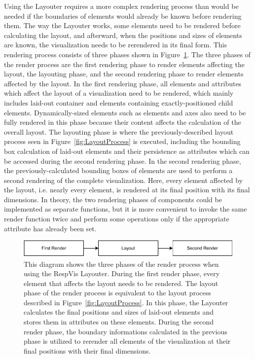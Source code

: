 Using the Layouter requires a more complex rendering process than
would be needed if the boundaries of elements would already be known
before rendering them.  The way the Layouter works, some elements need
to be rendered before calculating the layout, and afterward, when the
positions and sizes of elements are known, the visualization needs to
be rerendered in its final form. This rendering process consists of
three phases shown in Figure~\ref{fig:RenderProcess}. The three phases
of the render process are the first rendering phase to render elements
affecting the layout, the layouting phase, and the second rendering
phase to render elements affected by the layout. In the first
rendering phase, all elements and attributes which affect the layout
of a visualization need to be rendered, which mainly includes laid-out
container  and  elements containing
exactly-positioned child elements.  Dynamically-sized elements such as
 elements and axes also need to be fully rendered in this
phase because their content affects the calculation of the overall
layout. The layouting phase is where the previously-described layout
process seen in Figure~\ref{fig:LayoutProcess} is executed, including
the bounding box calculation of laid-out elements and their
persistence as attributes which can be accessed during the second
rendering phase. In the second rendering phase, the
previously-calculated bounding boxes of elements are used to perform a
second rendering of the complete visualization. Here, every element
affected by the layout, i.e. nearly every element, is rendered at its
final position with its final dimensions. In theory, the two
rendering phases of components could be implemented as separate
functions, but it is more convenient to invoke the same render
function twice and perform some operations only if the appropriate
 attribute has already been set.


\begin{figure}[tp]
\centering
\includegraphics[keepaspectratio,width=\linewidth,height=\fullh]
{diagrams/respvis-render-process.pdf}
\caption[Render Process When Using the Layouter]{%
This diagram shows the three phases of the render process when using
the RespVis Layouter.  During the first render phase, every element
that affects the layout needs to be rendered.  The layout phase of the
render process is equivalent to the layout process described in
Figure~\ref{fig:LayoutProcess}. In this phase, the Layouter
calculates the final positions and sizes of laid-out elements and
stores them in attributes on these elements.  During the second render
phase, the boundary informations calculated in the previous phase is
utilized to rerender all elements of the visualization at their final
positions with their final dimensions.  
}
\label{fig:RenderProcess}
\end{figure}




